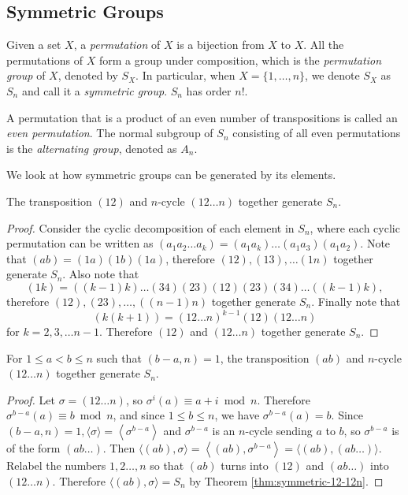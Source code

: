 \subsection{Symmetric Groups}
\begin{definition}  \label{def:permutation}
	Given a set $X$, a \textit{permutation} of $X$ is a bijection from $X$ to $X$. All the permutations of $X$ form a group under composition, which is the \textit{permutation group} of $X$, denoted by $S_X$. In particular, when $X = \{1, \dots, n\}$, we denote $S_X$ as $S_n$ and call it a \textit{symmetric group}. $S_n$ has order $n!$. 
\end{definition}

\begin{definition}
	A permutation that is a product of an even number of transpositions is called an \textit{even permutation}. The normal subgroup of $S_n$ consisting of all even permutations is the \textit{alternating group}, denoted as $A_n$. 
\end{definition}

We look at how symmetric groups can be generated by its elements. 

\begin{theorem} \label{thm:symmetric-12-12n}
	The transposition $(12)$ and $n$-cycle $(12 \dots n)$ together generate $S_n$. 
\end{theorem}
\begin{proof}
	Consider the cyclic decomposition of each element in $S_n$, where each cyclic permutation can be written as 
	$
	(a_1a_2\dots a_k) = (a_1 a_k) \dots (a_1 a_3) (a_1 a_2). 
	$
	Note that $(ab) = (1a)(1b)(1a)$, therefore $(12), (13), \ldots (1n)$ together generate $S_n$. Also note that  
	$$(1k)=((k-1)k)\dots(34)(23)(12)(23)(34)\dots((k-1)k),$$
	therefore $(12), (23), \dots, ((n-1)n)$ together generate $S_n$. Finally note that 
	$$
	(k(k+1)) = (12\dots n)^{k-1} (12) (12\dots n)
	$$
	for $k = 2, 3, \dots n - 1$. Therefore $(12)$ and $(12 \dots n)$ together generate $S_n$. 
\end{proof}

\begin{theorem} \label{thm:symmetric-ab-12n}
	For $1 \le a < b \le n$ such that $(b - a, n) = 1$, the transposition $(ab)$ and $n$-cycle $(12 \dots n)$ together generate $S_n$.
\end{theorem}
\begin{proof}
	Let $\sigma=(12 \ldots n)$, so $\sigma^i(a) \equiv a+i \bmod n$. Therefore $\sigma^{b-a}(a) \equiv b \bmod n$, and since $1 \le b \le n$, we have $\sigma^{b-a}(a)=b$. Since $(b-a, n)=1,\langle\sigma\rangle=\left\langle\sigma^{b-a}\right\rangle$ and $\sigma^{b-a}$ is an $n$-cycle sending $a$ to $b$, so $\sigma^{b-a}$ is of the form $(a b \ldots)$. Then
	$
	\langle(a b), \sigma\rangle=\left\langle(a b), \sigma^{b-a}\right\rangle=\langle(a b),(a b \ldots)\rangle .
	$
	Relabel the numbers $1,2 \ldots, n$ so that $(a b)$ turns into $(12)$ and $(a b \ldots)$ into $(12 \ldots n)$. Therefore $\langle(a b), \sigma\rangle=S_n$ by Theorem \ref{thm:symmetric-12-12n}.
\end{proof}

